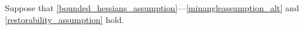 Suppose that \cref{bounded_hessians_assumption}---\cref{minangleassumption_alt} and \cref{restorability_assumption} hold.

